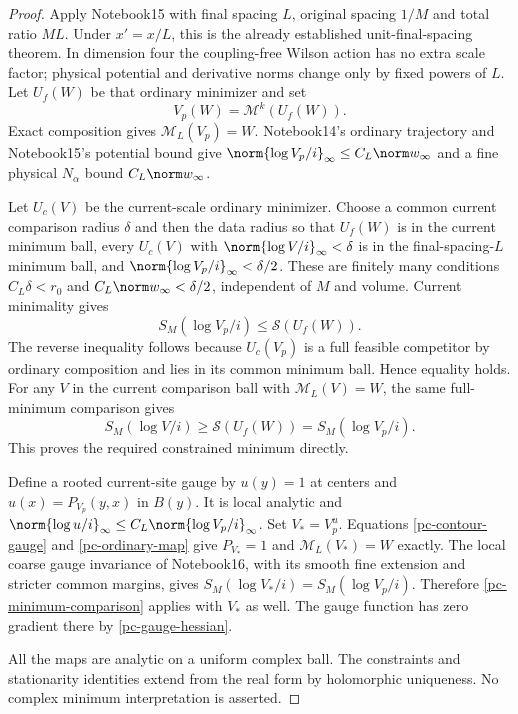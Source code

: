 \begin{proof}
Apply Notebook15 with final spacing $L$, original spacing
$1/M$ and total ratio $ML$. Under $x'=x/L$, this is the
already established unit-final-spacing theorem. In dimension
four the coupling-free Wilson action has no extra scale
factor; physical potential and derivative norms change only
by fixed powers of $L$. Let $U_f(W)$ be that ordinary
minimizer and set
\[
 V_p(W)=\mathcal M^k(U_f(W)).
\]
Exact composition gives $\mathcal M_L(V_p)=W$.
Notebook14's ordinary trajectory and Notebook15's potential
bound give $\norm{\log V_p/i}_\infty\le C_L\norm w_\infty$
and a fine physical $N_\alpha$ bound $C_L\norm w_\infty$.

Let $U_c(V)$ be the current-scale ordinary minimizer. Choose a
common current comparison radius $\delta$ and then the data
radius so that $U_f(W)$ is in the current minimum ball,
every $U_c(V)$ with $\norm{\log V/i}_\infty<\delta$ is in
the final-spacing-$L$ minimum ball, and
$\norm{\log V_p/i}_\infty<\delta/2$. These are finitely many
conditions $C_L\delta<r_0$ and
$C_L\norm w_\infty<\delta/2$, independent of $M$ and volume.
Current minimality gives
\[
 S_M(\log V_p/i)\le\mathcal S(U_f(W)).
\]
The reverse inequality follows because $U_c(V_p)$ is a full
feasible competitor by ordinary composition and lies in its
common minimum ball. Hence equality holds. For any $V$ in the
current comparison ball with $\mathcal M_L(V)=W$, the same
full-minimum comparison gives
\begin{equation}\label{pc-minimum-comparison}
 S_M(\log V/i)\ge\mathcal S(U_f(W))=S_M(\log V_p/i).
\end{equation}
This proves the required constrained minimum directly.

Define a rooted current-site gauge by
$u(y)=1$ at centers and $u(x)=P_{V_p}(y,x)$ in $B(y)$.
It is local analytic and
$\norm{\log u/i}_\infty\le C_L\norm{\log V_p/i}_\infty$.
Set $V_*=V_p^u$. Equations
\eqref{pc-contour-gauge} and \eqref{pc-ordinary-map} give
$P_{V_*}=1$ and $\mathcal M_L(V_*)=W$ exactly. The local
coarse gauge invariance of Notebook16, with its smooth fine
extension and stricter common margins, gives
$S_M(\log V_*/i)=S_M(\log V_p/i)$. Therefore
\eqref{pc-minimum-comparison} applies with $V_*$ as well.
The gauge function has zero gradient there by
\eqref{pc-gauge-hessian}.

All the maps are analytic on a uniform complex ball. The
constraints and stationarity identities extend from the real
form by holomorphic uniqueness. No complex minimum
interpretation is asserted.
\end{proof}

